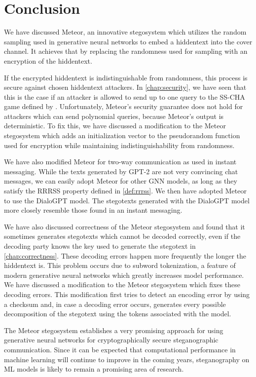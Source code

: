 \chapter{Conclusion}
\label{chap:conclusion}




%

We have discussed Meteor, an innovative stegosystem which utilizes the random sampling used in generative neural networks to embed a hiddentext into the cover channel.
It achieves that by replacing the randomness used for sampling with an encryption of the hiddentext.

If the encrypted hiddentext is indistinguishable from randomness, this process is secure against chosen hiddentext attackers.
In \autoref{chap:security}, we have seen that this is the case if an attacker is allowed to send up to one query to the SS-CHA game defined by \cite{Hopper2004}.
Unfortunately, Meteor's security guarantee does not hold for attackers which can send polynomial queries, because Meteor's output is deterministic.
To fix this, we have discussed a modification to the Meteor stegosystem which adds an initialization vector to the pseudorandom function used for encryption while maintaining indistinguishability from  randomness.

We have also modified Meteor for two-way communication as used in instant messaging.
While the texts generated by GPT-2 are not very convincing chat messages, we can easily adopt Meteor for other GNN models, as long as they satisfy the RRRSS property defined in \autoref{def:rrrss}.
We then have adopted Meteor to use the DialoGPT model.
The stegotexts generated with the DialoGPT model more closely resemble those found in an instant messaging.

We have also discussed correctness of the Meteor stegosystem and found that it sometimes generates stegotexts which cannot be decoded correctly, even if the decoding party knows the key used to generate the stegotext in \autoref{chap:correctness}.
These decoding errors happen more frequently the longer the hiddentext is.
This problem occurs due to subword tokenization, a feature of modern generative neural networks which greatly increases model performance.
We have discussed a modification to the Meteor stegosystem which fixes these decoding errors.
This modification first tries to detect an encoding error by using a checksum and, in case a decoding error occurs, generates every possible decomposition of the stegotext using the tokens associated with the model.

The Meteor stegosystem establishes a very promising approach for using generative neural networks for cryptographically secure steganographic communication. 
Since it can be expected that computational performance in machine learning will continue to improve in the coming years, steganography on ML models is likely to remain a promising area of research.
